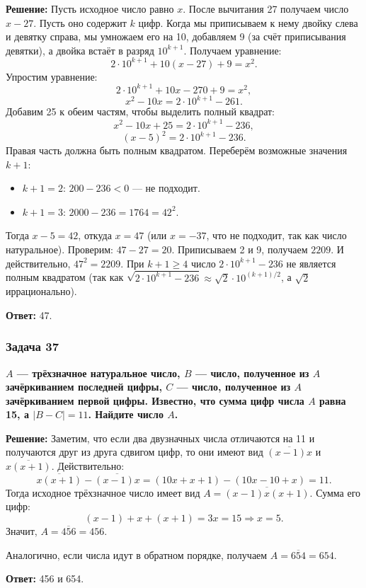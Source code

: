 \documentclass[12pt, a4paper]{article}
\begin{document}
\textbf{Решение:}
Пусть исходное число равно \(x\). После вычитания 27 получаем число \(x - 27\). Пусть оно содержит \(k\) цифр.
Когда мы приписываем к нему двойку слева и девятку справа, мы умножаем его на 10, добавляем 9 (за счёт приписывания девятки), а двойка встаёт в разряд \(10^{k+1}\). Получаем уравнение:
\[
2 \cdot 10^{k+1} + 10(x - 27) + 9 = x^2.
\]
Упростим уравнение:
\[
2 \cdot 10^{k+1} + 10x - 270 + 9 = x^2,
\]
\[
x^2 - 10x = 2 \cdot 10^{k+1} - 261.
\]
Добавим 25 к обеим частям, чтобы выделить полный квадрат:
\[
x^2 - 10x + 25 = 2 \cdot 10^{k+1} - 236,
\]
\[
(x - 5)^2 = 2 \cdot 10^{k+1} - 236.
\]
Правая часть должна быть полным квадратом. Переберём возможные значения \(k+1\):
\begin{itemize}
    \item \(k+1 = 2\): \(200 - 236 < 0\) — не подходит.
    \item \(k+1 = 3\): \(2000 - 236 = 1764 = 42^2\).
\end{itemize}
Тогда \(x - 5 = 42\), откуда \(x = 47\) (или \(x = -37\), что не подходит, так как число натуральное).
Проверим: \(47 - 27 = 20\). Приписываем 2 и 9, получаем \(2209\). И действительно, \(47^2 = 2209\).
При \(k+1 \ge 4\) число \(2 \cdot 10^{k+1} - 236\) не является полным квадратом (так как \(\sqrt{2 \cdot 10^{k+1} - 236} \approx \sqrt{2} \cdot 10^{(k+1)/2}\), а \(\sqrt{2}\) иррационально).

\textbf{Ответ:} 47.

\subsubsection*{Задача 37}
\textbf{$A$ — трёхзначное натуральное число, $B$ — число, полученное из $A$ зачёркиванием последней цифры, $C$ — число, полученное из $A$ зачёркиванием первой цифры. Известно, что сумма цифр числа $A$ равна 15, а $|B - C| = 11$. Найдите число $A$.}

\textbf{Решение:}
Заметим, что если два двузначных числа отличаются на 11 и получаются друг из друга сдвигом цифр, то они имеют вид $\overline{(x-1)x}$ и $\overline{x(x+1)}$. Действительно:
\[
\overline{x(x+1)} - \overline{(x-1)x} = (10x + x + 1) - (10x - 10 + x) = 11.
\]
Тогда исходное трёхзначное число имеет вид $A = \overline{(x-1)x(x+1)}$. Сумма его цифр:
\[
(x-1) + x + (x+1) = 3x = 15 \Rightarrow x = 5.
\]
Значит, $A = \overline{456} = 456$.

Аналогично, если числа идут в обратном порядке, получаем $A = \overline{654} = 654$.

\textbf{Ответ:} 456 и 654.
\end{document}
